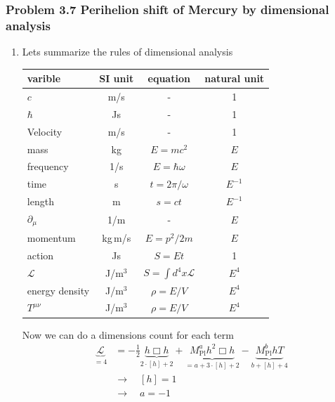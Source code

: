 \documentclass[10pt,a4paper]{article}
\theoremstyle{definition}
\begin{document}
\subsubsection{Problem 3.7 Perihelion shift of Mercury by dimensional analysis}
\begin{enumerate}[label=(\alph*)]
\item Lets summarize the rules of dimensional analysis 

\begin{center}
\begin{tabular}{ lccc } 
 \hline
 varible & SI unit &equation & natural unit \\ 
 \hline\hline
 $c$               & m/s    & -                        & 1        \\
 $\hbar$           & Js     & -                        & 1        \\
 Velocity          & m/s    & -                        & 1      \\
 mass              & kg     & $E=mc^2$                 & $E$      \\
 frequency         & 1/s    & $E=\hbar\omega$          & $E$      \\
 time              & s      & $t=2\pi/\omega$          & $E^{-1}$ \\
 length            & m      & $s=ct$                   & $E^{-1}$ \\
 $\partial_\mu$    & 1/m    & -                        & $E$      \\
 momentum          & kg\,m/s& $E=p^2/2m$               & $E$      \\
 action            & Js     & $S=Et$                   & 1        \\
 $\mathcal{L}$     & J/m$^3$& $S=\int d^4x\mathcal{L}$ & $E^4$    \\
 energy density    & J/m$^3$& $\rho=E/V$               & $E^4$    \\
 $T^{\mu\nu}$      & J/m$^3$& $\rho=E/V$               & $E^4$    \\
 \hline
\end{tabular}
\end{center}
Now we can do a dimensions count for each term
\begin{align}
\underbrace{\mathcal{L}}_{=4}&=-\frac{1}{2}\underbrace{h\Box h}_{2\cdot[h]+2}+ \underbrace{M_\text{Pl}^a h^2\Box h}_{=a+3\cdot[h]+2}-\underbrace{M_\text{Pl}^bhT}_{b+[h]+4}\\
&\rightarrow\quad[h]=1\\
&\rightarrow\quad a=-1\\

\end{align}
\end{enumerate}
\end{document}
